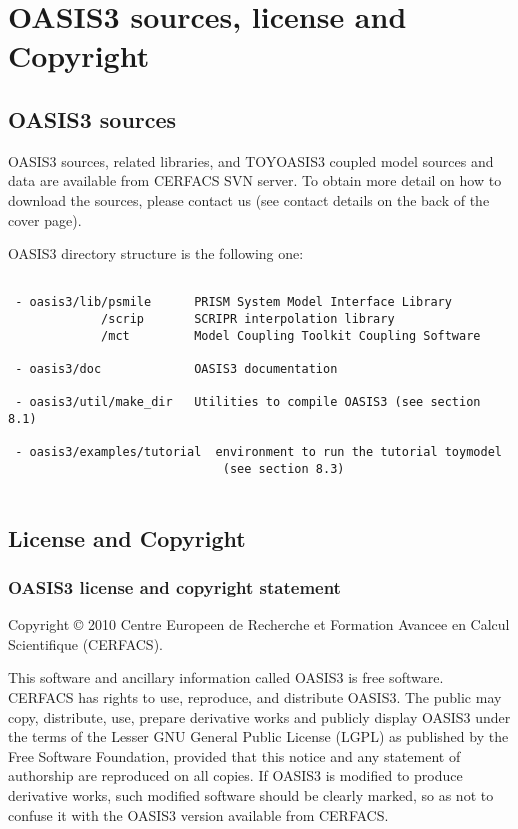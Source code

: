 \newpage
\chapter{OASIS3 sources, license and Copyright}
\label{sec_Obtaining}
%
%
\section{OASIS3 sources}
OASIS3 sources, related libraries, and TOYOASIS3
coupled model sources and data are available from CERFACS SVN server. To obtain more detail on how to download
the sources, please
contact us (see contact details on the back of the cover page).

OASIS3 directory structure is the following one:

\begin{verbatim}

 - oasis3/lib/psmile      PRISM System Model Interface Library
             /scrip       SCRIPR interpolation library
             /mct         Model Coupling Toolkit Coupling Software
                  
 - oasis3/doc             OASIS3 documentation
 
 - oasis3/util/make_dir   Utilities to compile OASIS3 (see section 8.1) 

 - oasis3/examples/tutorial  environment to run the tutorial toymodel
                              (see section 8.3)
 
\end{verbatim}
%                              
% 
%

\section{License and Copyright}

\subsection{OASIS3 license and copyright statement}

Copyright © 2010 Centre Europeen de Recherche et Formation
Avancee en Calcul Scientifique (CERFACS).  

This software and ancillary information called OASIS3 is free
software.  CERFACS has rights to use, reproduce, and distribute
OASIS3. The public may copy, distribute, use, prepare derivative works and
publicly display OASIS3 under the terms of the Lesser GNU General
Public License (LGPL) as published by the Free Software Foundation,
provided that this notice and any statement of authorship are
reproduced on all copies. If OASIS3 is modified to produce derivative
works, such modified software should be clearly marked, so as not to
confuse it with the OASIS3 version available from CERFACS.

